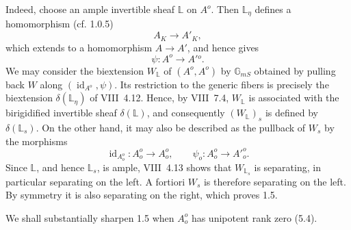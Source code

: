 Indeed, choose an ample invertible sheaf $\mathbb L$ on $A^o$.  Then
$\mathbb L_\eta$ defines a homomorphism (cf. 1.0.5)
\[
 A_K\longrightarrow A'_K,
\]
which extends to a homomorphism $A\longrightarrow A'$, and hence gives
\[
 \psi:A^o\longrightarrow A'{}^o.
\]
We may consider the biextension $W_{\mathbb L}$ of $(A^o,A^o)$ by
$\mathbb G_{mS}$ obtained by pulling back $W$ along
$(\operatorname{id}_{A^o},\psi)$.  Its restriction to the generic
fibers is precisely the biextension $\delta(\mathbb L_\eta)$ of
VIII~4.12.  Hence, by VIII~7.4, $W_{\mathbb L}$ is associated with the
birigidified invertible sheaf $\delta(\mathbb L)$, and consequently
$(W_{\mathbb L})_s$ is defined by $\delta(\mathbb L_s)$.  On the other
hand, it may also be described as the pullback of $W_s$ by the
morphisms
\[
 \operatorname{id}_{A_o^o}:A_o^o\longrightarrow A_o^o,
 \qquad
 \psi_o:A_o^o\longrightarrow {A'}_o^o.
\]
Since $\mathbb L$, and hence $\mathbb L_s$, is ample, VIII~4.13 shows
that $W_{\mathbb L_s}$ is separating, in particular separating on the
left.  A fortiori $W_s$ is therefore separating on the left.  By
symmetry it is also separating on the right, which proves 1.5.

We shall substantially sharpen 1.5 when $A_o^o$ has unipotent rank
zero (5.4).

